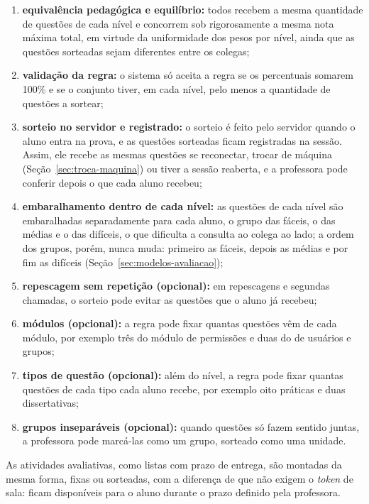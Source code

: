 \begin{enumerate}
    \item \textbf{equivalência pedagógica e equilíbrio:} todos recebem a mesma quantidade de questões de cada nível e concorrem sob rigorosamente a mesma nota máxima total, em virtude da uniformidade dos pesos por nível, ainda que as questões sorteadas sejam diferentes entre os colegas;
    \item \textbf{validação da regra:} o sistema só aceita a regra se os percentuais somarem 100\% e se o conjunto tiver, em cada nível, pelo menos a quantidade de questões a sortear;
    \item \textbf{sorteio no servidor e registrado:} o sorteio é feito pelo servidor quando o aluno entra na prova, e as questões sorteadas ficam registradas na sessão. Assim, ele recebe as mesmas questões se reconectar, trocar de máquina (Seção~\ref{sec:troca-maquina}) ou tiver a sessão reaberta, e a professora pode conferir depois o que cada aluno recebeu;
    \item \textbf{embaralhamento dentro de cada nível:} as questões de cada nível são embaralhadas separadamente para cada aluno, o grupo das fáceis, o das médias e o das difíceis, o que dificulta a consulta ao colega ao lado; a ordem dos grupos, porém, nunca muda: primeiro as fáceis, depois as médias e por fim as difíceis (Seção~\ref{sec:modelos-avaliacao});
    \item \textbf{repescagem sem repetição (opcional):} em repescagens e segundas chamadas, o sorteio pode evitar as questões que o aluno já recebeu;
    \item \textbf{módulos (opcional):} a regra pode fixar quantas questões vêm de cada módulo, por exemplo três do módulo de permissões e duas do de usuários e grupos;
    \item \textbf{tipos de questão (opcional):} além do nível, a regra pode fixar quantas questões de cada tipo cada aluno recebe, por exemplo oito práticas e duas dissertativas;
    \item \textbf{grupos inseparáveis (opcional):} quando questões só fazem sentido juntas, a professora pode marcá-las como um grupo, sorteado como uma unidade.
\end{enumerate}

As atividades avaliativas, como listas com prazo de entrega, são montadas da mesma forma, fixas ou sorteadas, com a diferença de que não exigem o \textit{token} de sala: ficam disponíveis para o aluno durante o prazo definido pela professora.

